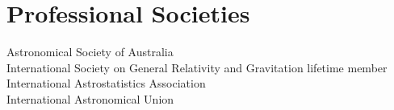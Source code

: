 \documentclass[margin,line]{res}
\begin{document}
\begin{resume}
\begin{tabular}{@{}p{0.8in}p{4.7in}}
\end{tabular}





\section{\sc Professional Societies}
Astronomical Society of Australia\\
International Society on General Relativity and Gravitation lifetime member\\
International Astrostatistics Association\\
International Astronomical Union




\end{resume}
\end{document}
